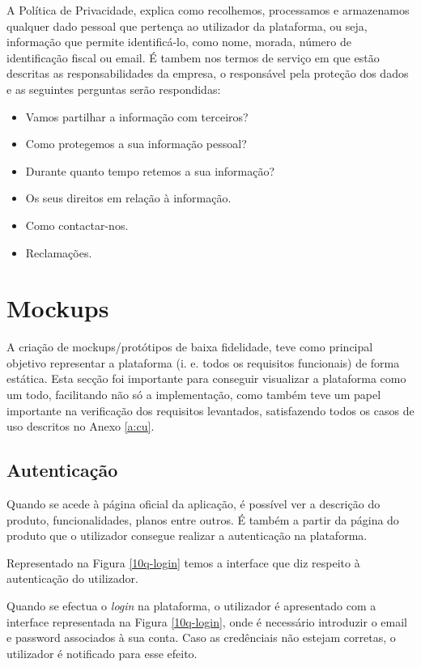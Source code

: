 A Política de Privacidade, explica como recolhemos, processamos e armazenamos qualquer dado pessoal que pertença ao utilizador da plataforma, ou seja, informação que permite identificá-lo, como nome, morada, número de identificação fiscal ou email. É tambem nos termos de serviço em que estão descritas as responsabilidades da empresa, o responsável pela proteção dos dados e as seguintes perguntas serão respondidas:
\begin{itemize}
	\item Vamos partilhar a informação com terceiros?
	\item Como protegemos a sua informação pessoal?
	\item Durante quanto tempo retemos a sua informação?
	\item Os seus direitos em relação à informação.
	\item Como contactar-nos.
	\item Reclamações.
\end{itemize}

\pagebreak

\section{Mockups}
\label{prototipagem}

A criação de mockups/protótipos de baixa fidelidade, teve como principal objetivo representar a plataforma (i. e. todos os requisitos funcionais) de forma estática. Esta secção foi importante para conseguir visualizar a plataforma como um todo, facilitando não só a implementação, como também teve um papel importante na verificação dos requisitos levantados, satisfazendo todos os casos de uso descritos no Anexo \ref{a:cu}. 

\subsection{Autenticação}

Quando se acede à página oficial da aplicação, é possível ver a descrição do produto, funcionalidades, planos entre outros. É também a partir da página do produto que o utilizador consegue realizar a autenticação na plataforma.

Representado na Figura \ref{10q-login} temos a interface que diz respeito à autenticação do utilizador.

Quando se efectua o \textit{login} na plataforma, o utilizador é apresentado com a interface representada na Figura \ref{10q-login}, onde é necessário introduzir o email e password associados à sua conta. Caso as credênciais não estejam corretas, o utilizador é notificado para esse efeito.

